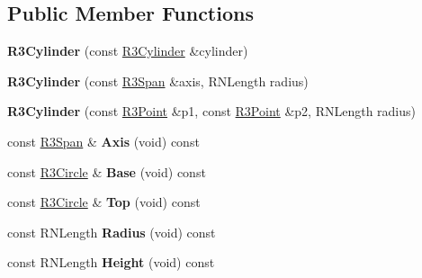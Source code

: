 \subsection*{Public Member Functions}
\begin{DoxyCompactItemize}
\item 
{\bfseries R3\+Cylinder} (const \hyperlink{class_r3_cylinder}{R3\+Cylinder} \&cylinder)\hypertarget{class_r3_cylinder_a2f7720cfcb923aeefda8ab987f2c3613}{}\label{class_r3_cylinder_a2f7720cfcb923aeefda8ab987f2c3613}

\item 
{\bfseries R3\+Cylinder} (const \hyperlink{class_r3_span}{R3\+Span} \&axis, R\+N\+Length radius)\hypertarget{class_r3_cylinder_a74060d68ff772137a5959605dbc9a85c}{}\label{class_r3_cylinder_a74060d68ff772137a5959605dbc9a85c}

\item 
{\bfseries R3\+Cylinder} (const \hyperlink{class_r3_point}{R3\+Point} \&p1, const \hyperlink{class_r3_point}{R3\+Point} \&p2, R\+N\+Length radius)\hypertarget{class_r3_cylinder_ab534885f3e5b74922e483b6cccad50d7}{}\label{class_r3_cylinder_ab534885f3e5b74922e483b6cccad50d7}

\item 
const \hyperlink{class_r3_span}{R3\+Span} \& {\bfseries Axis} (void) const \hypertarget{class_r3_cylinder_af9713e6727376ad7b36609b7630f0474}{}\label{class_r3_cylinder_af9713e6727376ad7b36609b7630f0474}

\item 
const \hyperlink{class_r3_circle}{R3\+Circle} \& {\bfseries Base} (void) const \hypertarget{class_r3_cylinder_a7f7aec4a4ad963824866cc7c9d577ae5}{}\label{class_r3_cylinder_a7f7aec4a4ad963824866cc7c9d577ae5}

\item 
const \hyperlink{class_r3_circle}{R3\+Circle} \& {\bfseries Top} (void) const \hypertarget{class_r3_cylinder_a021176baa6fde6f8b217da7c92be5835}{}\label{class_r3_cylinder_a021176baa6fde6f8b217da7c92be5835}

\item 
const R\+N\+Length {\bfseries Radius} (void) const \hypertarget{class_r3_cylinder_aa021a3ad2508da849ddff73ca89b65e8}{}\label{class_r3_cylinder_aa021a3ad2508da849ddff73ca89b65e8}

\item 
const R\+N\+Length {\bfseries Height} (void) const \hypertarget{class_r3_cylinder_a4cbde13d0de53b95342ddc7f884a4422}{}\label{class_r3_cylinder_a4cbde13d0de53b95342ddc7f884a4422}


\end{DoxyCompactItemize}
